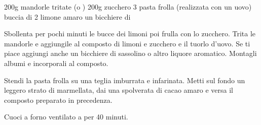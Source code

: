 \begin{ingreds}
	200g mandorle tritate (o )
	200g zucchero
	3 
	pasta frolla (realizzata con un uovo)
	buccia di 2 limone
	 amaro
	un bicchiere di 


\end{ingreds}

\begin{method}
Sbollenta per pochi minuti le bucce dei limoni poi frulla con lo zucchero. Trita le mandorle e aggiungile al composto di limoni e zucchero e il tuorlo d'uovo. Se ti piace aggiungi anche un bicchiere di sassolino o altro liquore aromatico. Montagli albumi e incorporali al composto.

Stendi la pasta frolla su una teglia imburrata e infarinata. Metti sul fondo un leggero strato di marmellata, dai una spolverata di cacao amaro e versa il composto preparato in precedenza.

Cuoci a forno ventilato a  per 40 minuti.


\end{method}



